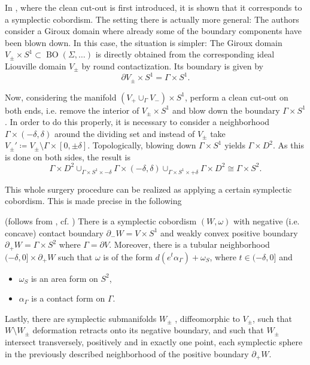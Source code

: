 In \cite[Section 6]{MNW13}, where the clean cut-out is first introduced,
it is shown that it corresponds to a symplectic cobordism.
The setting there is actually more general: The authors consider a Giroux
domain where already some of the boundary components have been blown down.
In this case, the situation is simpler: The Giroux domain 
$V_\pm \times S^1 \subset \operatorname{BO}(\Sigma, \dots)$
is directly obtained from the corresponding ideal Liouville domain $V_\pm$ by 
round contactization.
Its boundary is given by 
\[
    \partial V_\pm \times S^1 = \Gamma \times S^1.
\]

Now, considering the manifold $(V_+ \cup_\Gamma V_-)\times S^1$, perform a clean cut-out
on both ends, i.e. remove the interior of $V_\pm \times S^1$ and blow down the boundary $\Gamma \times S^1$.
In order to do this properly, it is necessary to consider a neighborhood 
$\Gamma \times (-\delta, \delta)$ around the dividing set and 
instead of $V_\pm$ take $V_\pm' \coloneqq V_\pm \setminus \Gamma \times [0, \pm \delta]$.
Topologically, blowing down $\Gamma \times S^1$ yields $\Gamma \times D^2$.
As this is done on both sides, the result is 
\[
    \Gamma \times D^2 \cup_{\Gamma \times S^1 \times -\delta} \Gamma \times (-\delta,\delta) 
    \cup_{\Gamma \times S^1 \times +\delta} \Gamma \times D^2 \cong \Gamma \times S^2.
\]


This whole surgery procedure can be realized as applying a certain symplectic cobordism.
This is made precise in the following
\begin{lemma}(follows from \cite[Theorem 6.1]{MNW13}, cf. \cite[Lemma 6.1]{BGM22})\label{lem:capping_cobordism}
    There is a symplectic cobordism $(W, \omega)$ with negative (i.e. concave) 
    contact boundary $\partial_-W = V \times S^1$ and weakly convex positive boundary
    $\partial_+ W = \Gamma \times S^2$ where $\Gamma = \partial V$. 
    Moreover, there is a tubular neighborhood $(-\delta, 0] \times \partial_+ W$
    such that $\omega$ is of the form $d(e^t \alpha_\Gamma) + \omega_S$, 
    where $t \in (-\delta, 0]$ and 
    \begin{itemize}
        \item $\omega_S$ is an area form on $S^2$,
        \item $\alpha_\Gamma$ is a contact form on $\Gamma$.
    \end{itemize}
    Lastly, there are symplectic submanifolds $W_\pm$ , diffeomorphic to $V_\pm$, 
    such that $W\setminus W_\pm$ deformation retracts onto its negative boundary, 
    and such that $W_\pm$ intersect transversely, positively and in exactly one point, 
    each symplectic sphere in the previously described neighborhood 
    of the positive boundary $\partial_+ W$.
\end{lemma}

